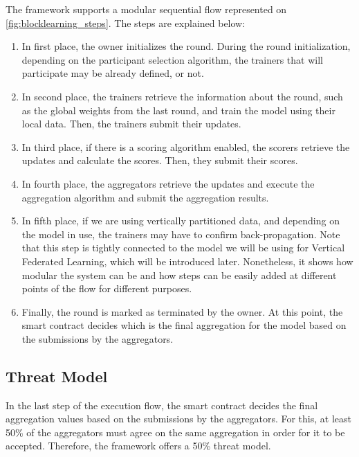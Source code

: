 The framework supports a modular sequential flow represented on \autoref{fig:blocklearning_steps}. The steps are explained below:

\begin{enumerate}
    \item In first place, the owner initializes the round. During the round initialization, depending on the participant selection algorithm, the trainers that will participate may be already defined, or not.
    
    \item In second place, the trainers retrieve the information about the round, such as the global weights from the last round, and train the model using their local data. Then, the trainers submit their updates.
    
    \item In third place, if there is a scoring algorithm enabled, the scorers retrieve the updates and calculate the scores. Then, they submit their scores.
    
    \item In fourth place, the aggregators retrieve the updates and execute the aggregation algorithm and submit the aggregation results.
    
    \item In fifth place, if we are using vertically partitioned data, and depending on the model in use, the trainers may have to confirm back-propagation. Note that this step is tightly connected to the model we will be using for Vertical Federated Learning, which will be introduced later. Nonetheless, it shows how modular the system can be and how steps can be easily added at different points of the flow for different purposes.
    
    \item Finally, the round is marked as terminated by the owner. At this point, the smart contract decides which is the final aggregation for the model based on the submissions by the aggregators.
\end{enumerate}

\subsection{Threat Model}

In the last step of the execution flow, the smart contract decides the final aggregation values based on the submissions by the aggregators. For this, at least 50\% of the aggregators must agree on the same aggregation in order for it to be accepted. Therefore, the framework offers a 50\% threat model.

